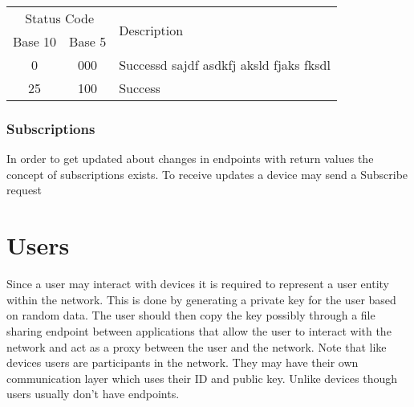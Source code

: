 \documentclass[a4paper]{report}
\begin{document}
                    \begin{center}
                        \begin{tabular}{|c|c|l|}
                            \multicolumn{2}{|c|}{Status Code} & \multirow{2}{*}{Description} \\
                            Base 10 & Base 5 & \\\hline
                            0 & 000 & Successd sajdf asdkfj aksld fjaks fksdl \\
                            25 & 100 & Success
                        \end{tabular}
                    \end{center}
                    
				\subsubsection{Subscriptions}
					In order to get updated about changes in endpoints with return values the concept of subscriptions exists. To receive updates a device may send a Subscribe request 
                    
        \clearpage
        \section{Users}\label{section:interaction:user}
            Since a user may interact with devices it is required to represent a user entity within the network. This is done by generating a private key for the user based on random data. The user should then copy the key possibly through a file sharing endpoint between applications that allow the user to interact with the network and act as a proxy between the user and the network. Note that like devices users are participants in the network. They may have their own communication layer which uses their ID and public key. Unlike devices though users usually don't have endpoints.
	
	\clearpage
	\printglossary[type=\acronymtype]
    \printglossary
 
    \clearpage
    
    
	
\end{document}
